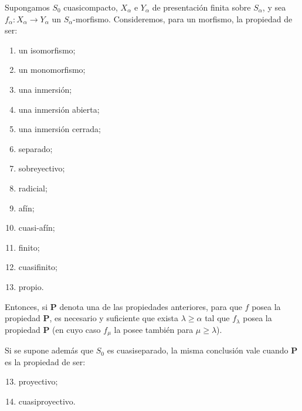 \begin{theorem}[8.10.5]
\label{IV.8.10.5}
Supongamos $S_0$ cuasicompacto, $X_\alpha$ e $Y_\alpha$ de presentación finita sobre $S_\alpha$, y sea $f_\alpha:X_\alpha\to Y_\alpha$ un $S_\alpha$-morfismo.
Consideremos, para un morfismo, la propiedad de ser:
\begin{enumerate}[label=(\roman*)]
\item un isomorfismo;
\item[\rm(i\,\emph{bis})] un monomorfismo;
\item una inmersión;
\item una inmersión abierta;
\item una inmersión cerrada;
\item separado;
\item sobreyectivo;
\item radicial;
\item afín;
\item cuasi-afín;
\item finito;
\item cuasifinito;
\item propio.
\end{enumerate}
Entonces, si $\mathbf{P}$ denota una de las propiedades anteriores, para que $f$ posea la propiedad $\mathbf{P}$, es necesario y suficiente que exista $\lambda\geqslant\alpha$ tal que $f_\lambda$ posea la propiedad $\mathbf{P}$ (en cuyo caso $f_\mu$ la posee también para $\mu\geqslant\lambda$).

Si se supone además que $S_0$ es cuasiseparado, la misma conclusión vale cuando $\mathbf{P}$ es la propiedad de ser:
\begin{enumerate}[label=(\roman*)]
\setcounter{enumi}{12}
\item proyectivo;
\item cuasiproyectivo.
\end{enumerate}
\end{theorem}

